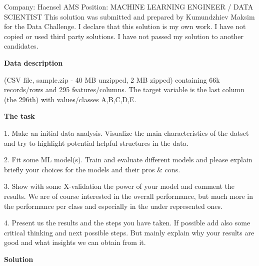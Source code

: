 \documentclass[12pt]{article}
\begin{document}
\maketitle
\begin{center}
		\author{\Large Maksim Kumundzheiv}
	\end{center}

Company: Haensel AMS\newline
Position: MACHINE LEARNING ENGINEER / DATA SCIENTIST\newline
This solution was submitted and prepared by Kumundzhiev Maksim for the Data Challenge. I declare that this solution is my own work. I have not copied or used third party solutions. I have not passed my solution to another candidates.
\bigskip

\newpage
\textbf{Data description}

(CSV file, sample.zip - 40 MB unzipped, 2 MB zipped) containing 66k records/rows and 295 features/columns. The target variable is the last column (the 296th) with values/classes A,B,C,D,E.\newline

\textbf{The task}\newline

1. Make an initial data analysis.
Visualize the main characteristics of the datset and try to highlight potential helpful structures in the data.

2. Fit some ML model(s).
Train and evaluate different models and please explain briefly your choices for the models and their pros & cons.

3. Show with some X-validation the power of your model and comment the results.
We are of course interested in the overall performance, but much more in the performance per class and especially in the under represented ones.

4. Present us the results and the steps you have taken.
If possible add also some critical thinking and next possible steps. But mainly explain why your results are good and what insights we can obtain from it.\newline

\textbf{Solution}\newline
\end{document}
